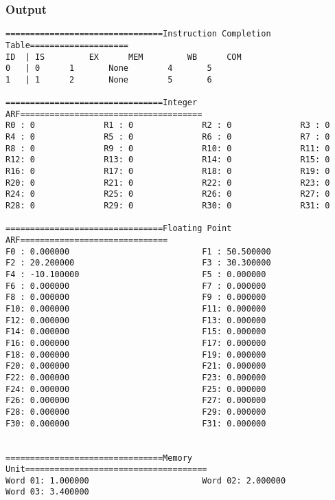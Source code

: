 \documentclass[12pt]{article}
\begin{document}
\subsubsection*{Output}
\begin{verbatim}
================================Instruction Completion Table====================
ID	| IS		 EX		 MEM		 WB		 COM
0	| 0		 1		 None		 4		 5
1	| 1		 2		 None		 5		 6

================================Integer ARF=====================================
R0 : 0              R1 : 0              R2 : 0              R3 : 0              
R4 : 0              R5 : 0              R6 : 0              R7 : 0              
R8 : 0              R9 : 0              R10: 0              R11: 0              
R12: 0              R13: 0              R14: 0              R15: 0              
R16: 0              R17: 0              R18: 0              R19: 0              
R20: 0              R21: 0              R22: 0              R23: 0              
R24: 0              R25: 0              R26: 0              R27: 0              
R28: 0              R29: 0              R30: 0              R31: 0              

================================Floating Point ARF==============================
F0 : 0.000000                           F1 : 50.500000                          
F2 : 20.200000                          F3 : 30.300000                          
F4 : -10.100000                         F5 : 0.000000                           
F6 : 0.000000                           F7 : 0.000000                           
F8 : 0.000000                           F9 : 0.000000                           
F10: 0.000000                           F11: 0.000000                           
F12: 0.000000                           F13: 0.000000                           
F14: 0.000000                           F15: 0.000000                           
F16: 0.000000                           F17: 0.000000                           
F18: 0.000000                           F19: 0.000000                           
F20: 0.000000                           F21: 0.000000                           
F22: 0.000000                           F23: 0.000000                           
F24: 0.000000                           F25: 0.000000                           
F26: 0.000000                           F27: 0.000000                           
F28: 0.000000                           F29: 0.000000                           
F30: 0.000000                           F31: 0.000000                           


================================Memory Unit=====================================
Word 01: 1.000000                       Word 02: 2.000000                       
Word 03: 3.400000   
\end{verbatim}
\end{document}
